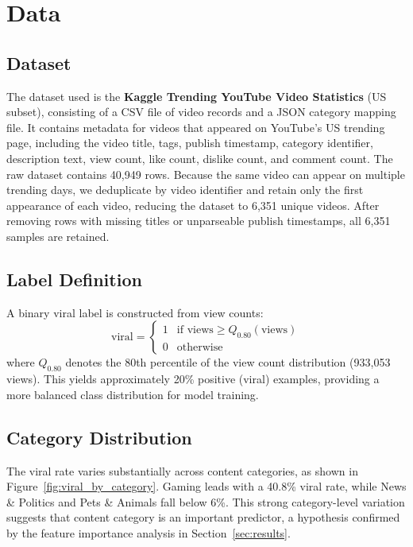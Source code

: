 \documentclass[12pt,a4paper]{article}
\begin{document}
\section{Data}

\subsection{Dataset}

The dataset used is the \textbf{Kaggle Trending YouTube Video Statistics} (US
subset), consisting of a CSV file of video records and a JSON category mapping
file.  It contains metadata for videos that appeared on YouTube's US trending
page, including the video title, tags, publish timestamp, category identifier,
description text, view count, like count, dislike count, and comment count.
The raw dataset contains 40,949 rows.  Because the same video can appear on
multiple trending days, we deduplicate by video identifier and retain only the
first appearance of each video, reducing the dataset to 6,351 unique videos.
After removing rows with missing titles or unparseable publish timestamps, all
6,351 samples are retained.

\subsection{Label Definition}

A binary viral label is constructed from view counts:
\[
  \text{viral} =
  \begin{cases}
    1 & \text{if } \text{views} \geq Q_{0.80}(\text{views}) \\
    0 & \text{otherwise}
  \end{cases}
\]
where $Q_{0.80}$ denotes the 80th percentile of the view count distribution
(933,053 views).  This yields approximately 20\% positive (viral) examples,
providing a more balanced class distribution for model training.

\subsection{Category Distribution}

The viral rate varies substantially across content categories, as shown in
Figure~\ref{fig:viral_by_category}.  Gaming leads with a 40.8\% viral rate,
while News \& Politics and Pets \& Animals fall below 6\%.  This strong
category-level variation suggests that content category is an important
predictor, a hypothesis confirmed by the feature importance analysis in
Section~\ref{sec:results}.
\end{document}
